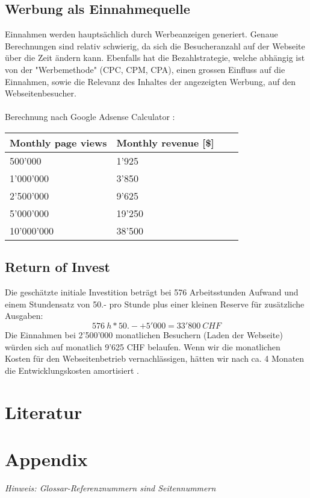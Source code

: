 \documentclass[11pt,ngerman]{article}
\begin{document}
    \subsection{Werbung als Einnahmequelle}
    Einnahmen werden hauptsächlich durch Werbeanzeigen generiert. Genaue Berechnungen sind relativ schwierig, da sich die Besucheranzahl auf der Webseite über die Zeit ändern kann. Ebenfalls hat die Bezahlstrategie, welche abhängig ist von der "Werbemethode" (CPC, CPM, CPA), einen grossen Einfluss auf die Einnahmen, sowie die Relevanz des Inhaltes der angezeigten Werbung, auf den Webseitenbesucher\cite{CPCVsCPA2019}\cite{daswani2008online}. \\
    \\
    Berechnung nach Google Adsense Calculator \cite{GoogleAdSenseEarn}:
    \begin{center}
        \begin{tabular}{ | l | l | l | p{5cm} |}
            \hline
            Monthly page views & Monthly revenue [\$]  \\ \hline
            500'000 & 1'925 \\ \hline
            1'000'000 & 3'850 \\ \hline
            2'500'000 & 9'625 \\ \hline
            5'000'000 & 19'250 \\ \hline
            10'000'000 & 38'500 \\ \hline
        \end{tabular}
    \end{center}
    \subsection{Return of Invest}
    Die geschätzte initiale Investition beträgt bei 576 Arbeitsstunden Aufwand und einem Stundensatz von 50.- pro Stunde plus einer kleinen Reserve für zusätzliche Ausgaben:
    \[576\ h * 50.- + 5'000 = 33'800\ CHF\]
    Die Einnahmen bei 2'500'000 monatlichen Besuchern (Laden der Webseite)  würden sich auf monatlich 9'625 CHF belaufen. Wenn wir die monatlichen Kosten für den Webseitenbetrieb vernachlässigen, hätten wir nach ca. 4 Monaten die Entwicklungskosten amortisiert    .\\

    \newpage

    \section{Literatur}
    \printbibliography[heading=none]

     \newpage

    \section{Appendix}
    \textit{Hinweis: Glossar-Referenznummern sind Seitennummern}
    \printglossary
\end{document}
